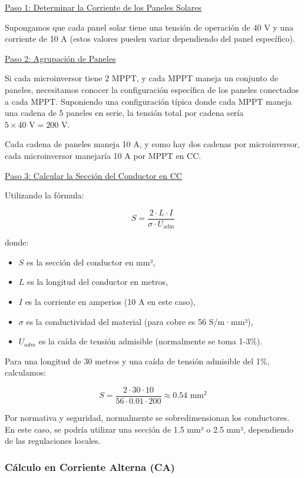 \documentclass{article}
\begin{document}
\uline{Paso 1: Determinar la Corriente de los Paneles Solares}

Supongamos que cada panel solar tiene una tensión de operación de 40 V y una corriente de 10 A (estos valores pueden variar dependiendo del panel específico).

\uline{Paso 2: Agrupación de Paneles}

Si cada microinversor tiene 2 MPPT, y cada MPPT maneja un conjunto de paneles, necesitamos conocer la configuración específica de los paneles conectados a cada MPPT. Suponiendo una configuración típica donde cada MPPT maneja una cadena de 5 paneles en serie, la tensión total por cadena sería \(5 \times 40 \text{ V} = 200 \text{ V}\).

Cada cadena de paneles maneja 10 A, y como hay dos cadenas por microinversor, cada microinversor manejaría 10 A por MPPT en CC.

\uline{Paso 3: Calcular la Sección del Conductor en CC}

Utilizando la fórmula:

$$
S = \frac{2 \cdot L \cdot I}{\sigma \cdot U_{\text{adm}}}
$$

donde:
\begin{itemize}
    \item \(S\) es la sección del conductor en mm²,
    \item \(L\) es la longitud del conductor en metros,
    \item \(I\) es la corriente en amperios (10 A en este caso),
    \item \(\sigma\) es la conductividad del material (para cobre es 56 S/m·mm²),
    \item $U_{adm}$ es la caída de tensión admisible (normalmente se toma 1-3\%).
\end{itemize}

Para una longitud de 30 metros y una caída de tensión admisible del 1\%, calculamos:

$$
S = \frac{2 \cdot 30 \cdot 10}{56 \cdot 0.01 \cdot 200} \approx 0.54 \text{ mm}^2
$$

Por normativa y seguridad, normalmente se sobredimensionan los conductores. En este caso, se podría utilizar una sección de 1.5 mm² o 2.5 mm², dependiendo de las regulaciones locales.

\subsubsection{Cálculo en Corriente Alterna (CA)}
\end{document}

